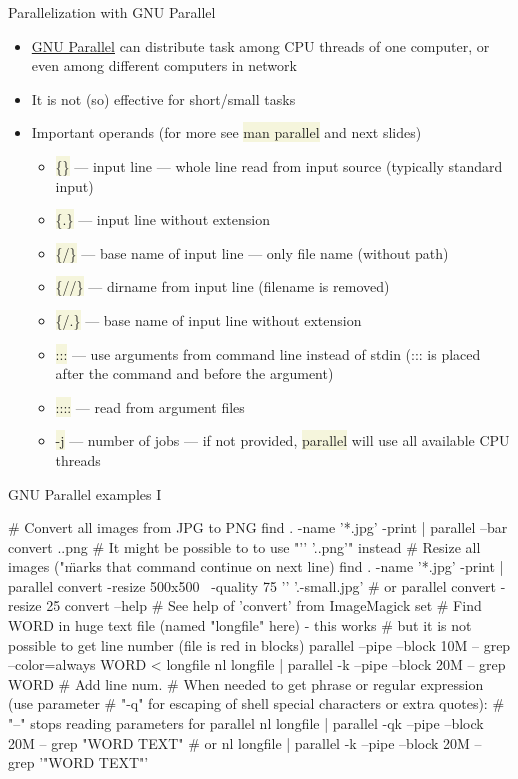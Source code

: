\documentclass[compress, xelatex, 11pt, xcolor=svgnames, aspectratio=169,
	hyperref={
		bookmarks=true,
		unicode=true,
		colorlinks=true,
		pdftitle={Linux, command line and MetaCentrum},
		plainpages=false,
		pdfauthor={Vojtech Zeisek},
		pdfsubject={Course about use of Linux command line, writing shell scripts and using MetaCentrum of CESNET},
		pdfcreator={XeLaTeX},
		pdfkeywords={Linux, GNU, BASH, shell, command line, MetaCentrum},
		linkcolor=DarkRed, %
		anchorcolor=DarkBlue, %
		citecolor=Indigo, %
		filecolor=NavyBlue, %
		menucolor=DarkMagenta, %
		urlcolor=DarkBlue, %
		},
	url={hyphens, lowtilde} %
	]{beamer}
\renewcommand{\texttt}[1]{\colorbox{Beige}{{\ttfamily #1}}}
\begin{document}
\begin{frame}{Parallelization with GNU Parallel}
	\begin{itemize}
		\item \href{https://www.gnu.org/software/parallel/}{GNU Parallel} can distribute task among CPU threads of one computer, or even among different computers in network
		\item It is not (so) effective for short/small tasks
		\item Important operands (for more see \texttt{man parallel} and next slides)
		\begin{itemize}
			\item \texttt{\{\}} --- input line --- whole line read from input source (typically standard input)
			\item \texttt{\{.\}} --- input line without extension
			\item \texttt{\{/\}} --- base name of input line --- only file name (without path)
			\item \texttt{\{//\}} --- dirname from input line (filename is removed)
			\item \texttt{\{/.\}} --- base name of input line without extension
			\item \texttt{:::} --- use arguments from command line instead of stdin (::: is placed after the command and before the argument)
			\item \texttt{::::} --- read from argument files
			\item \texttt{-j} --- number of jobs --- if not provided, \texttt{parallel} will use all available CPU threads
		\end{itemize}
	\end{itemize}
\end{frame}

\begin{frame}[fragile]{GNU Parallel examples I} %
	\begin{bashcode}
    # Convert all images from JPG to PNG
    find . -name '*.jpg' -print | parallel --bar convert {} {.}.png
    # It might be possible to to use "'{}' '{.}.png'" instead
    # Resize all images ("\" marks that command continue on next line)
    find . -name '*.jpg' -print | parallel convert -resize 500x500 \
      -quality 75 '{}' '{.}-small.jpg' # or
    parallel convert -resize 25%
    convert --help # See help of 'convert' from ImageMagick set
    # Find WORD in huge text file (named "longfile" here) - this works
    # but it is not possible to get line number (file is red in blocks)
    parallel --pipe --block 10M -- grep --color=always WORD < longfile
    nl longfile | parallel -k --pipe --block 20M -- grep WORD # Add line num.
    # When needed to get phrase or regular expression (use parameter
    # "-q" for escaping of shell special characters or extra quotes):
    # "--" stops reading parameters for parallel
    nl longfile | parallel -qk --pipe --block 20M -- grep "WORD TEXT" # or
    nl longfile | parallel -k --pipe --block 20M -- grep '"WORD TEXT"'
	\end{bashcode}
\end{frame}
\end{document}
